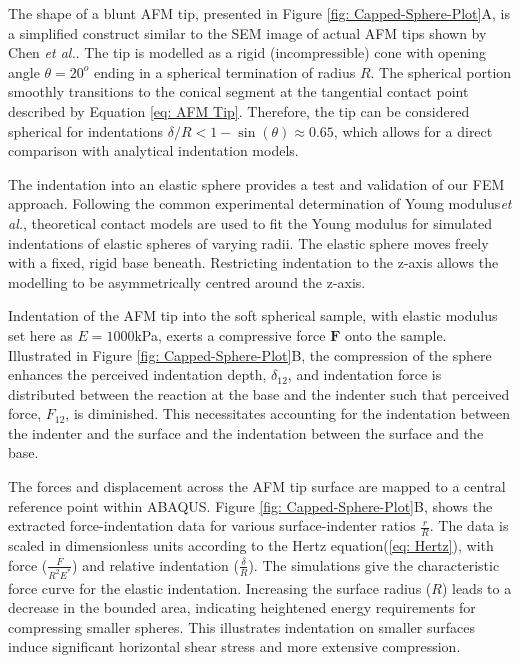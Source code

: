 The shape of a blunt AFM tip, presented in Figure \ref{fig: Capped-Sphere-Plot}A, is a simplified construct similar to the SEM image of actual AFM tips shown by Chen \textit{et al.}\cite{chen_luo_doudevski_erten_kim_2019}. The tip is modelled as a rigid (incompressible) cone with opening angle $\theta = 20^o$ ending in a spherical termination of radius $R$\cite{canet2014correction}. The spherical portion smoothly transitions to the conical segment at the tangential contact point described by Equation \ref{eq: AFM Tip}. Therefore, the tip can be considered spherical for indentations $\delta/R < 1-\sin(\theta) \approx 0.65$, which allows for a direct comparison with analytical indentation models.

The indentation into an elastic sphere provides a test and validation of our FEM approach. Following the common experimental determination of Young modulus\textit{et al.}\cite{sun2021determination,DIMITRIADIS20022798,kontomaris2019determination, kontomaris2020hertz}, theoretical contact models are used to fit the Young modulus for simulated indentations of elastic spheres of varying radii. The elastic sphere moves freely with a fixed, rigid base beneath. Restricting indentation to the z-axis allows the modelling to be asymmetrically centred around the z-axis. 

Indentation of the AFM tip into the soft spherical sample, with elastic modulus set here as $E = 1000$kPa, exerts a compressive force $\mathbf{F}$ onto the sample. Illustrated in Figure \ref{fig: Capped-Sphere-Plot}B, the compression of the sphere enhances the perceived indentation depth, $\delta_{12}$, and indentation force is distributed between the reaction at the base and the indenter such that perceived force, $F_{12}$, is diminished. This necessitates accounting for the indentation between the indenter and the surface and the indentation between the surface and the base. 

The forces and displacement across the AFM tip surface are mapped to a central reference point within ABAQUS. Figure \ref{fig: Capped-Sphere-Plot}B, shows the extracted force-indentation data for various surface-indenter ratios $\frac{r}{R}$. The data is scaled in dimensionless units according to the Hertz equation(\ref{eq: Hertz}), with force ($\frac{F}{R^2E^*}$) and relative indentation ($\frac{\delta}{R}$). The simulations give the characteristic force curve for the elastic indentation. Increasing the surface radius ($R$) leads to a decrease in the bounded area, indicating heightened energy requirements for compressing smaller spheres. This illustrates indentation on smaller surfaces induce significant horizontal shear stress and more extensive compression.

